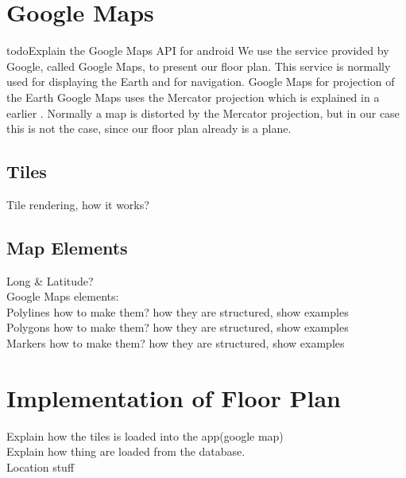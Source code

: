 \section{Google Maps}
todo{Explain the Google Maps API for android}
We use the service provided by Google, called Google Maps, to present our floor plan. This service is normally used for displaying the Earth and for navigation. Google Maps for projection of the Earth Google Maps uses the Mercator projection which is explained in a earlier . Normally a map is distorted by the Mercator projection, but in our case this is not the case, since our floor plan already is a plane.
\subsection*{Tiles}
Tile rendering, how it works?\\
\subsection*{Map Elements}
Long \& Latitude?\\
Google Maps elements:\\
Polylines how to make them? how they are structured, show examples\\
Polygons how to make them? how they are structured, show examples\\
Markers how to make them? how they are structured, show examples\\

\section*{Implementation of Floor Plan} 
Explain how the tiles is loaded into the app(google map)\\
Explain how thing are loaded from the database.\\
Location stuff
	
